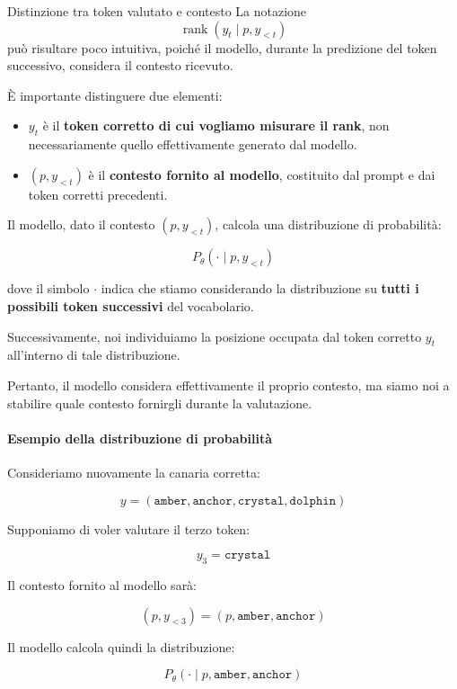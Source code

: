 \begin{observation}{Distinzione tra token valutato e contesto}
La notazione
\[
\operatorname{rank}(y_t\mid p,y_{<t})
\]
può risultare poco intuitiva, poiché il modello, durante la predizione del token successivo, considera il contesto ricevuto.

È importante distinguere due elementi:
\begin{itemize}
    \item $y_t$ è il \textbf{token corretto di cui vogliamo misurare il rank}, non necessariamente quello effettivamente generato dal modello.
    
    \item $(p,y_{<t})$ è il \textbf{contesto fornito al modello}, costituito dal prompt e dai token corretti precedenti.
\end{itemize}

Il modello, dato il contesto $(p,y_{<t})$, calcola una distribuzione di probabilità:

\[
P_\theta(\cdot\mid p,y_{<t})
\]

dove il simbolo $\cdot$ indica che stiamo considerando la distribuzione su \textbf{tutti i possibili token successivi} del vocabolario.

Successivamente, noi individuiamo la posizione occupata dal token corretto $y_t$ all'interno di tale distribuzione.

Pertanto, il modello considera effettivamente il proprio contesto, ma siamo noi a stabilire quale contesto fornirgli durante la valutazione.
\end{observation}

\paragraph{Esempio della distribuzione di probabilità}

Consideriamo nuovamente la canaria corretta:

\[
y=(\texttt{amber},\texttt{anchor},
\texttt{crystal},\texttt{dolphin})
\]

Supponiamo di voler valutare il terzo token:

\[
y_3=\texttt{crystal}
\]

Il contesto fornito al modello sarà:

\[
(p,y_{<3})
=
(p,\texttt{amber},\texttt{anchor})
\]

Il modello calcola quindi la distribuzione:

\[
\boxed{
P_\theta(\cdot\mid
p,\texttt{amber},\texttt{anchor})
}
\]

